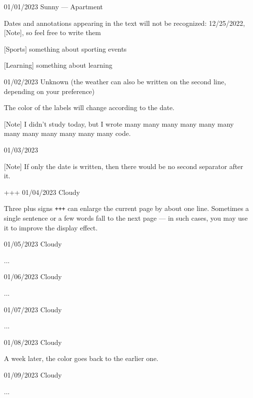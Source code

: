 \documentclass[11pt, paperstyle=light yellow, color entry, month-day-year]{jwjournal}
\begin{document}
01/01/2023 Sunny --- Apartment

  Dates and annotations appearing in the text will not be recognized: 12/25/2022, [Note], so feel free to write them

  [Sports] something about sporting events

  [Learning] something about learning



01/02/2023
Unknown (the weather can also be written on the second line, depending on your preference)

  The color of the labels will change according to the date.

  [Note] I didn't study today, but I wrote many many many many many many many many many many many many code.



01/03/2023

  [Note] If only the date is written, then there would be no second separator after it.


+++
01/04/2023  Cloudy

  Three plus signs \texttt{+++} can enlarge the current page by about one line. Sometimes a single sentence or a few words fall to the next page --- in such cases, you may use it to improve the display effect.



01/05/2023  Cloudy

  ...



01/06/2023  Cloudy

  ...



01/07/2023  Cloudy

  ...



01/08/2023  Cloudy

  A week later, the color goes back to the earlier one.



01/09/2023  Cloudy

  ...
\end{document}
